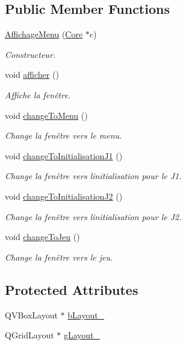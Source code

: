 \subsection*{Public Member Functions}
\begin{DoxyCompactItemize}
\item 
\hyperlink{class_affichage_menu_a68e70ec71422f3cb651299f08c85987e}{Affichage\+Menu} (\hyperlink{class_core}{Core} $\ast$c)
\begin{DoxyCompactList}\small\item\em Constructeur. \end{DoxyCompactList}\item 
void \hyperlink{class_affichage_menu_abec0adf6db92df26a937ff702a5a87fc}{afficher} ()
\begin{DoxyCompactList}\small\item\em Affiche la fenêtre. \end{DoxyCompactList}\item 
void \hyperlink{class_affichage_menu_a5f825906a1c5afccfbb03b007906bd28}{change\+To\+Menu} ()
\begin{DoxyCompactList}\small\item\em Change la fenêtre vers le menu. \end{DoxyCompactList}\item 
void \hyperlink{class_affichage_menu_ab7df249dc5db82d25613b80c28ba1ed4}{change\+To\+Initialisation\+J1} ()
\begin{DoxyCompactList}\small\item\em Change la fenêtre vers l\textquotesingle{}initialisation pour le J1. \end{DoxyCompactList}\item 
void \hyperlink{class_affichage_menu_a1980bc54a6156938cc3b737972facd32}{change\+To\+Initialisation\+J2} ()
\begin{DoxyCompactList}\small\item\em Change la fenêtre vers l\textquotesingle{}initialisation pour le J2. \end{DoxyCompactList}\item 
void \hyperlink{class_affichage_menu_a878a89a1ce7e138695e3e5fde5e020af}{change\+To\+Jeu} ()
\begin{DoxyCompactList}\small\item\em Change la fenêtre vers le jeu. \end{DoxyCompactList}\end{DoxyCompactItemize}
\subsection*{Protected Attributes}
\begin{DoxyCompactItemize}
\item 
Q\+V\+Box\+Layout $\ast$ \hyperlink{class_affichage_menu_a190c22c6af2b9d0f5f45b727a1f60838}{b\+Layout\+\_\+}
\item 
Q\+Grid\+Layout $\ast$ \hyperlink{class_affichage_menu_a33ee17880f8d6d985c19eebf0e5f121b}{g\+Layout\+\_\+}
\end{DoxyCompactItemize}


